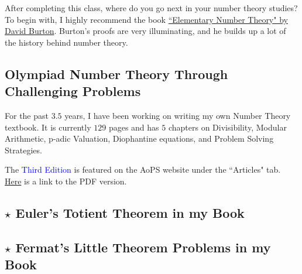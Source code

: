 After completing this class, where do you go next in your number theory studies? To begin with, I highly recommend the book \href{https://www.amazon.com/Elementary-Number-Theory-Paperback-Burton/dp/1259025764/ref=mt_paperback?_encoding=UTF8&me=}{``Elementary Number Theory" by David Burton}. Burton's proofs are very illuminating, and he builds up a lot of the history behind number theory.
\clearpage

\subsection{Olympiad Number Theory Through Challenging Problems}
For the past $3.5$ years, I have been working on writing my own Number Theory textbook. It is currently $129$ pages and has $5$ chapters on Divisibility, Modular Arithmetic, p-adic Valuation, Diophantine equations, and Problem Solving Strategies.

The \textcolor{blue}{Third Edition} is featured on the AoPS website under the ``Articles" tab. \href{http://s3.amazonaws.com/aops-cdn.artofproblemsolving.com/resources/articles/olympiad-number-theory.pdf}{Here} is a link to the PDF version.
\subsection*{$\star$ Euler's Totient Theorem in my Book}

\subsection*{$\star$ Fermat's Little Theorem Problems in my Book}


